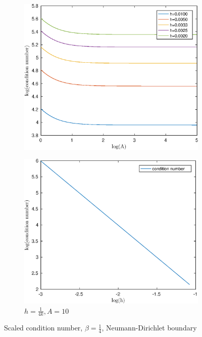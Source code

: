 \documentclass[12pt]{article}
\begin{document}
\begin{figure}[h!]
\centering
\begin{subfigure}{0.4\textwidth}
\includegraphics[width=\textwidth]{cond-A-4-ND}
\caption{}
\end{subfigure}
\hfill
\begin{subfigure}{0.4\textwidth}
\includegraphics[width=\textwidth]{cond-N-4-ND}
\caption{$h=\frac{1}{4k},A=10$}
\end{subfigure}
\caption{Scaled condition number, $\beta=\frac{1}{4}$, Neumann-Dirichlet boundary}
\end{figure}
\end{document}
